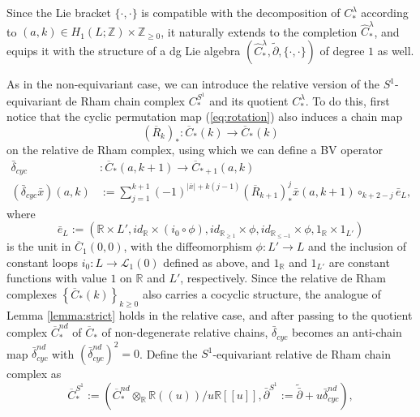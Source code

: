 \documentclass[a4paper]{article}
\numberwithin{equation}{section}
\begin{document}
Since the Lie bracket $\{\cdot,\cdot\}$ is compatible with the decomposition of $C_\ast^\lambda$ according to $(a,k)\in H_1(L;\mathbb{Z})\times\mathbb{Z}_{\geq0}$, it naturally extends to the completion $\widehat{C}_\ast^\lambda$, and equips it with the structure of a dg Lie algebra $\left(\widehat{C}_\ast^\lambda,\tilde{\partial},\{\cdot,\cdot\}\right)$ of degree $1$ as well.

As in the non-equivariant case, we can introduce the relative version of the $S^1$-equivariant de Rham chain complex $C_\ast^{S^1}$ and its quotient $C_\ast^\lambda$. To do this, first notice that the cyclic permutation map (\ref{eq:rotation}) also induces a chain map
\begin{equation}
(\overline{R}_k)_\ast:\overline{C}_\ast(k)\rightarrow\overline{C}_\ast(k)
\end{equation}
on the relative de Rham complex, using which we can define a BV operator
\begin{equation}\label{eq:bar-BV}
\begin{split}
\bar{\delta}_\mathit{cyc}&:\overline{C}_\ast(a,k+1)\rightarrow\overline{C}_{\ast+1}(a,k) \\
(\bar{\delta}_\mathit{cyc}\bar{x})(a,k)&:=\sum_{j=1}^{k+1}(-1)^{|\bar{x}|+k(j-1)}(\overline{R}_{k+1})_\ast^j\bar{x}(a,k+1)\circ_{k+2-j}\bar{e}_L,
\end{split}
\end{equation}
where
\begin{equation}
\bar{e}_L:=\left(\mathbb{R}\times L',\mathit{id}_\mathbb{R}\times(i_0\circ\phi),\mathit{id}_{\mathbb{R}_{\geq1}}\times\phi,\mathit{id}_{\mathbb{R}_{\leq-1}}\times\phi,1_\mathbb{R}\times1_{L'}\right)
\end{equation}
is the unit in $\overline{C}_1(0,0)$, with the diffeomorphism $\phi:L'\rightarrow L$ and the inclusion of constant loops $i_0:L\rightarrow\mathcal{L}_1(0)$ defined as above, and $1_\mathbb{R}$ and $1_{L'}$ are constant functions with value $1$ on $\mathbb{R}$ and $L'$, respectively. Since the relative de Rham complexes $\left\{\overline{C}_\ast(k)\right\}_{k\geq0}$ also carries a cocyclic structure, the analogue of Lemma \ref{lemma:strict} holds in the relative case, and after passing to the quotient complex $\overline{C}_\ast^\mathit{nd}$ of $\overline{C}_\ast$ of non-degenerate relative chains, $\bar{\delta}_\mathit{cyc}$ becomes an anti-chain map $\bar{\delta}_\mathit{cyc}^\mathit{nd}$ with $(\bar{\delta}_\mathit{cyc}^\mathit{nd})^2=0$. Define the $S^1$-equivariant relative de Rham chain complex as
\begin{equation}
\overline{C}_\ast^{S^1}:=\left(\overline{C}_\ast^\mathit{nd}\otimes_\mathbb{R}\mathbb{R}((u))/u\mathbb{R}[[u]],\bar{\partial}^{S^1}:=\tilde{\bar{\partial}}+u\bar{\delta}_\mathit{cyc}^\mathit{nd}\right),
\end{equation}
\end{document}
